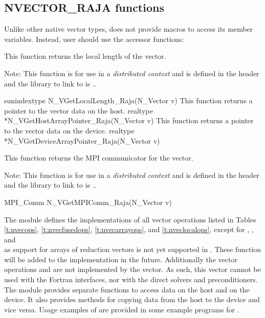 \subsection{NVECTOR\_RAJA functions}
\label{ss:nvec_raja_functions}

Unlike other native {\sundials} vector types, {\nvecraja} does not provide macros
to access its member variables. Instead, user should use the accessor functions:
{
  This function returns the local length of the vector.

  Note: This function is for use in a \textit{distributed context} and
  is defined in the header  and the library
  to link to is ..
}
{
  sunindextype N\_VGetLocalLength\_Raja(N\_Vector v)
}
{
  This function returns a pointer to the vector data on the host.
}
{
  realtype *N\_VGetHostArrayPointer\_Raja(N\_Vector v)
}
{
  This function returns a pointer to the vector data on the device.
}
{
  realtype *N\_VGetDeviceArrayPointer\_Raja(N\_Vector v)
}
{
  This function returns the MPI communicator for the vector.

  Note: This function is for use in a \textit{distributed context}
  and is defined in the header  and the
  library to link to is ..
}
{
  MPI\_Comm N\_VGetMPIComm\_Raja(N\_Vector v)
}

The {\nvecraja} module defines the implementations of all vector operations listed
in Tables \ref{t:nvecops}, \ref{t:nvecfusedops}, \ref{t:nvecarrayops},
and \ref{t:nveclocalops}, except
for , , and \\ \noindent
{} as support for arrays of reduction vectors is not
yet supported in {\raja}. These function will be added to the {\nvecraja}
implementation in the future. Additionally the vector operations  and
 are not implemented by the {\raja} vector.
As such, this vector cannot be used with the {\sundials} Fortran interfaces,
nor with the {\sundials} direct solvers and preconditioners.
The {\nvecraja} module provides separate functions to access data on the host
and on the device. It also provides methods for copying data from the host to
the device and vice versa. Usage examples of {\nvecraja} are provided in
some example programs for {\cvode} \cite{cvode_ex}.

